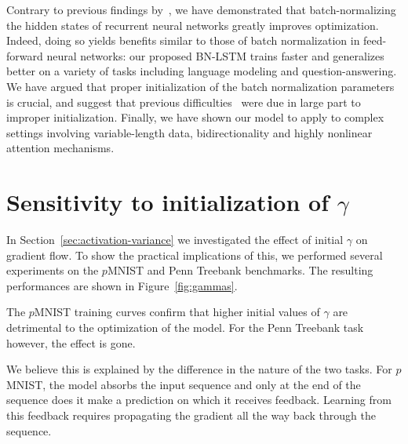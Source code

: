 \documentclass{article} %
\begin{document}
Contrary to previous findings by~\citet{cesar,baidu},
we have demonstrated that batch-normalizing the hidden states of recurrent neural networks greatly improves optimization.
Indeed, doing so yields benefits similar to those of batch normalization in feed-forward neural networks:
our proposed BN-LSTM trains faster and generalizes better on a variety of tasks including language modeling and question-answering.
We have argued that proper initialization of the batch normalization parameters is crucial,
and suggest that previous difficulties~\citep{cesar, baidu} were due in large part to improper initialization.
Finally, we have shown our model to apply to complex settings involving variable-length data, bidirectionality and highly nonlinear attention mechanisms.






\appendix

\section{Sensitivity to initialization of $\gamma$}

In Section~\ref{sec:activation-variance} we investigated the effect of initial $\gamma$ on gradient flow.
To show the practical implications of this, we performed several experiments on the $p$MNIST and Penn Treebank benchmarks.
The resulting performances are shown in Figure~\ref{fig:gammas}.

The $p$MNIST training curves confirm that higher initial values of $\gamma$ are detrimental to the optimization of the model.
For the Penn Treebank task however, the effect is gone.

We believe this is explained by the difference in the nature of the two tasks.
For $p$MNIST, the model absorbs the input sequence and only at the end of the sequence does it make a prediction on which it receives feedback.
Learning from this feedback requires propagating the gradient all the way back through the sequence.
\end{document}
